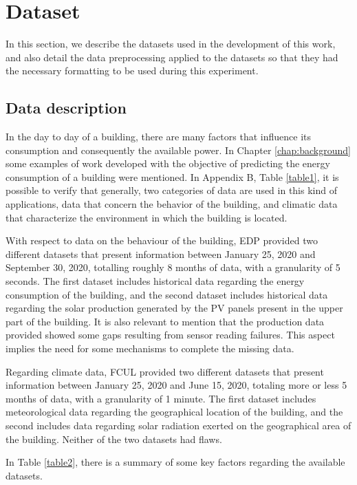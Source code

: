 \section{Dataset}\label{chap5:dataset}

In this section, we describe the datasets used in the development of this work, and also detail the data preprocessing applied to the datasets so that they had the necessary formatting to be used during this experiment.

\subsection{Data description}

In the day to day of a building, there are many factors that influence its consumption and consequently the available power. In Chapter \ref{chap:background} some examples of work developed with the objective of predicting the energy consumption of a building were mentioned. In Appendix B, Table \ref{table1}, it is possible to verify that generally, two categories of data are used in this kind of applications, data that concern the behavior of the building, and climatic data that characterize the environment in which the building is located.

With respect to data on the behaviour of the building, \ac{EDP} provided two different datasets that present information between January 25, 2020 and September 30, 2020, totalling roughly 8 months of data, with a granularity of 5 seconds. The first dataset includes historical data regarding the energy consumption of the building, and the second dataset includes historical data regarding the solar production generated by the \ac{PV} panels present in the upper part of the building. It is also relevant to mention that the production data provided showed some gaps resulting from sensor reading failures. This aspect implies the need for some mechanisms to complete the missing data.

Regarding climate data, \ac{FCUL} provided two different datasets that present information between January 25, 2020 and June 15, 2020, totaling more or less 5 months of data, with a granularity of 1 minute. The first dataset includes meteorological data regarding the geographical location of the building, and the second includes data regarding solar radiation exerted on the geographical area of the building. Neither of the two datasets had flaws.

In Table \ref{table2}, there is a summary of some key factors regarding the available datasets.


